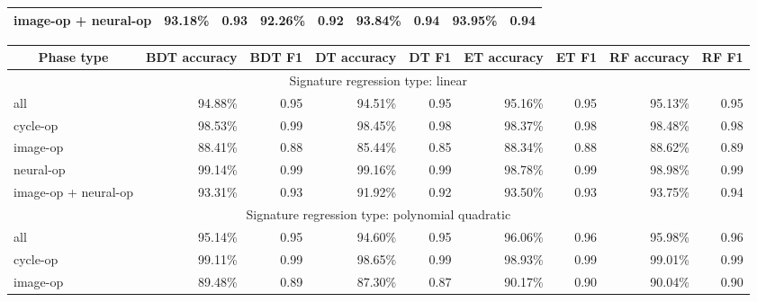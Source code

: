 \begin{table*}[htbp]
\begin{subtable}{\textwidth}
\begin{tabular}{@{}lrrrrrrrr@{}}
            image-op + neural-op 	& 93.18\%  & 0.93  & 92.26\%  & 0.92  & 93.84\%  & 0.94  & 93.95\%  & 0.94 \\
            \bottomrule
        \end{tabular}
    \end{subtable}
    \vspace{1em}
    \begin{subtable}{\textwidth}
        \centering
        \caption{Model performance results for mid-cut segmentation, applied to each phase type}
        \label{tab:model_performance_mid}
        \begin{tabular}{@{}lrrrrrrrr@{}}
            \toprule
            \multicolumn{1}{c}{\textbf{Phase type}} & 
            \multicolumn{1}{c}{\textbf{BDT accuracy}} & 
            \multicolumn{1}{c}{\textbf{BDT F1}} & 
            \multicolumn{1}{c}{\textbf{DT accuracy}} &
            \multicolumn{1}{c}{\textbf{DT F1}} &
            \multicolumn{1}{c}{\textbf{ET accuracy}} &
            \multicolumn{1}{c}{\textbf{ET F1}} &
            \multicolumn{1}{c}{\textbf{RF accuracy}} &
            \multicolumn{1}{c}{\textbf{RF F1}} \\
            \midrule
            \multicolumn{9}{c}{Signature regression type: linear} \\
	        \midrule
            all               		& 94.88\%  & 0.95  & 94.51\%  & 0.95  & 95.16\%  & 0.95  & 95.13\%  & 0.95 \\
            cycle-op          		& 98.53\%  & 0.99  & 98.45\%  & 0.98  & 98.37\%  & 0.98  & 98.48\%  & 0.98 \\
            image-op          		& 88.41\%  & 0.88  & 85.44\%  & 0.85  & 88.34\%  & 0.88  & 88.62\%  & 0.89 \\
            neural-op         		& 99.14\%  & 0.99  & 99.16\%  & 0.99  & 98.78\%  & 0.99  & 98.98\%  & 0.99 \\
            image-op + neural-op 	& 93.31\%  & 0.93  & 91.92\%  & 0.92  & 93.50\%  & 0.93  & 93.75\%  & 0.94 \\
            \midrule
	        \multicolumn{9}{c}{Signature regression type: polynomial quadratic} \\
	        \midrule
	        all               		& 95.14\%  & 0.95  & 94.60\%  & 0.95  & 96.06\%  & 0.96  & 95.98\%  & 0.96 \\
            cycle-op          		& 99.11\%  & 0.99  & 98.65\%  & 0.99  & 98.93\%  & 0.99  & 99.01\%  & 0.99 \\
            image-op          		& 89.48\%  & 0.89  & 87.30\%  & 0.87  & 90.17\%  & 0.90  & 90.04\%  & 0.90 \\

\end{tabular}
\end{subtable}
\end{table*}
